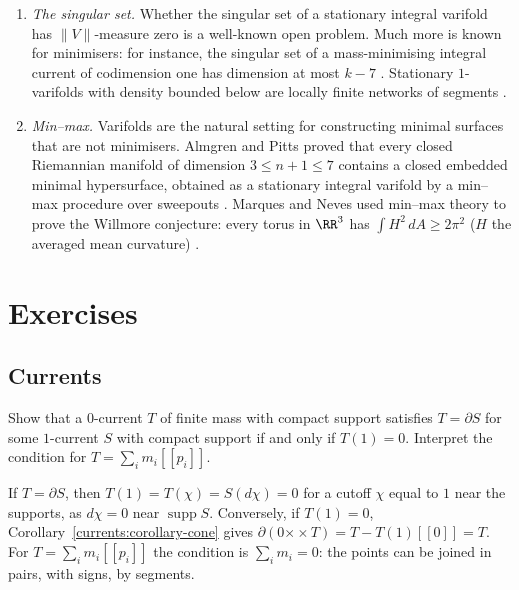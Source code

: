 \begin{remark}\label{currents:remark-survey}
\begin{enumerate}
\item \emph{The singular set.} Whether the singular set of a stationary integral varifold has $\|V\|$-measure zero is a well-known open problem. Much more is known for minimisers: for instance, the
singular set of a mass-minimising integral current of codimension one has dimension at most $k - 7$ \cite{simon-gmt}. Stationary $1$-varifolds with density bounded below are locally finite networks of
segments \cite{allard-almgren-1976}.
\item \emph{Min--max.} Varifolds are the natural setting for constructing minimal surfaces that are not minimisers. Almgren and Pitts proved that every closed Riemannian manifold of dimension $3 \leq n + 1 \leq 7$
contains a closed embedded minimal hypersurface, obtained as a stationary integral varifold by a min--max procedure over sweepouts \cite{pitts-1981}. Marques and Neves used min--max theory to prove the
Willmore conjecture: every torus in $\RR^3$ has $\int H^2\,dA \geq 2\pi^2$ ($H$ the averaged mean curvature) \cite{marques-neves-2014}.
\end{enumerate}
\end{remark}

\section{Exercises}\label{currents:section-exercises}

\subsection{Currents}\label{currents:subsection-exercises-currents}

\begin{exercise}\label{currents:exercise-boundary-point}
Show that a $0$-current $T$ of finite mass with compact support satisfies $T = \partial S$ for some $1$-current $S$ with compact support if and only if $T(1) = 0$. Interpret the condition for
$T = \sum_im_i[\![p_i]\!]$.
\end{exercise}

\begin{solution}
If $T = \partial S$, then $T(1) = T(\chi) = S(d\chi) = 0$ for a cutoff $\chi$ equal to $1$ near the supports, as $d\chi = 0$ near $\operatorname{supp}S$. Conversely, if $T(1) = 0$, Corollary~\ref{currents:corollary-cone}
gives $\partial(0 \mathbin{\times\!\!\!\!\times} T) = T - T(1)[\![0]\!] = T$. For $T = \sum_im_i[\![p_i]\!]$ the condition is $\sum_im_i = 0$: the points can be joined in pairs, with signs, by segments.
\end{solution}


